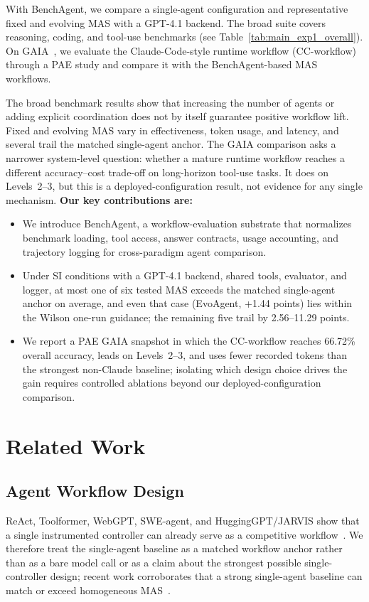 With BenchAgent, we compare a single-agent configuration and representative fixed and evolving MAS with a GPT-4.1 backend.
The broad suite covers reasoning, coding, and tool-use benchmarks (see Table~\ref{tab:main_exp1_overall}).
On GAIA~\citep{mialon2023gaia}, we evaluate the Claude-Code-style runtime workflow (CC-workflow) through a PAE study and compare it with the BenchAgent-based MAS workflows.

The broad benchmark results show that increasing the number of agents or adding explicit coordination does not by itself guarantee positive workflow lift.
Fixed and evolving MAS vary in effectiveness, token usage, and latency, and several trail the matched single-agent anchor.
The GAIA comparison asks a narrower system-level question: whether a mature runtime workflow reaches a different accuracy--cost trade-off on long-horizon tool-use tasks.
It does on Levels~2--3, but this is a deployed-configuration result, not evidence for any single mechanism.
\textbf{Our key contributions are:}
\begin{itemize}[nosep, leftmargin=12pt]
    \item We introduce BenchAgent, a workflow-evaluation substrate that normalizes benchmark loading, tool access, answer contracts, usage accounting, and trajectory logging for cross-paradigm agent comparison.
    \item Under SI conditions with a GPT-4.1 backend, shared tools, evaluator, and logger, at most one of six tested MAS exceeds the matched single-agent anchor on average, and even that case (EvoAgent, +1.44 points) lies within the Wilson one-run guidance; the remaining five trail by 2.56--11.29 points.
    \item We report a PAE GAIA snapshot in which the CC-workflow reaches 66.72\% overall accuracy, leads on Levels~2--3, and uses fewer recorded tokens than the strongest non-Claude baseline; isolating which design choice drives the gain requires controlled ablations beyond our deployed-configuration comparison.
\end{itemize}


\section{Related Work}
\subsection{Agent Workflow Design}
ReAct, Toolformer, WebGPT, SWE-agent, and HuggingGPT/JARVIS show that a single instrumented controller can already serve as a competitive workflow~\citep{yao2022react,schick2023toolformer,nakano2021webgpt,yang2024sweagent,shen2023hugginggpt}.
We therefore treat the single-agent baseline as a matched workflow anchor rather than as a bare model call or as a claim about the strongest possible single-controller design; recent work corroborates that a strong single-agent baseline can match or exceed homogeneous MAS~\citep{xu2026rethinking}.

